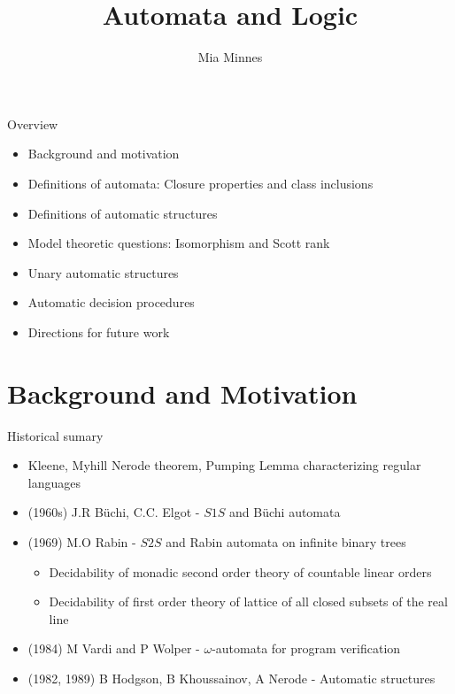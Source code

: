 \documentclass[style=fyma
 ]{powerdot}
\title{Automata and Logic}
\author{Mia Minnes}
\begin{document}
\maketitle

\begin{slide}{Overview}
  \begin{itemize}
    \item Background and motivation
    \item Definitions of automata: Closure properties and class inclusions
    \item Definitions of automatic structures
    \item Model theoretic questions: Isomorphism and Scott rank
    \item Unary automatic structures
    \item Automatic decision procedures
    \item Directions for future work
  \end{itemize}
\end{slide}

\section{Background and Motivation}

\begin{slide}{Historical sumary}
  \begin{itemize}
    \item Kleene, Myhill Nerode theorem, Pumping Lemma characterizing regular languages
    \item (1960s) J.R B\"uchi, C.C. Elgot - $S1S$ and B\"uchi automata
    \item (1969) M.O Rabin - $S2S$ and Rabin automata on infinite binary trees
      \begin{itemize}
        \item Decidability of monadic second order theory of countable linear orders
        \item Decidability of first order theory of lattice of all closed subsets of the real line
      \end{itemize}
    \item (1984) M Vardi and P Wolper - $\omega$-automata for program verification
    \item (1982, 1989) B Hodgson, B Khoussainov, A Nerode - Automatic structures
  \end{itemize}
\end{slide}
\end{document}
